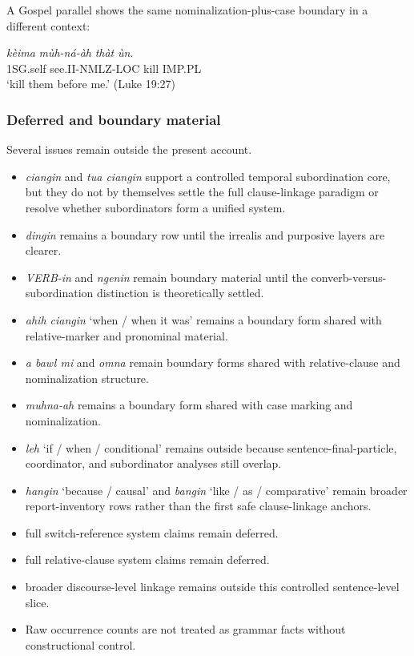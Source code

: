 \documentclass[
  11pt,
  a4paper,
]{article}
\providecommand{\tightlist}{%
  \setlength{\itemsep}{0pt}\setlength{\parskip}{0pt}}
\newcommand{\tdim}[1]{\textit{#1}}
\newcommand{\tdimword}[1]{\textit{#1}}
\renewcommand{\textsc}[1]{{\footnotesize\MakeUppercase{#1}}}
\newcommand{\glossquote}[1]{`#1'}
\begin{document}
A Gospel parallel shows the same nominalization-plus-case boundary in a
different context:

\begin{exe}
\ex \label{ex:clause-muhnaah-luke19p27}
\gll \tdimword{kèima} \tdimword{mùh-ná-àh} \tdimword{thàt} \tdimword{ùn.} \\
     \textsc{1sg}.self see.\textsc{ii}-\textsc{nmlz}-\textsc{loc} kill \textsc{imp}.\textsc{pl} \\
\glt \glossquote{kill them before me.} (Luke 19:27)
\end{exe}

\subsubsection{Deferred and boundary
material}\label{deferred-and-boundary-material-9}

Several issues remain outside the present account.

\begin{itemize}
\tightlist
\item
  \tdim{ciangin} and \tdim{tua ciangin} support a controlled temporal
  subordination core, but they do not by themselves settle the full
  clause-linkage paradigm or resolve whether subordinators form a
  unified system.
\item
  \tdim{dingin} remains a boundary row until the irrealis and purposive
  layers are clearer.
\item
  \tdim{VERB-in} and \tdim{ngenin} remain boundary material until the
  converb-versus-subordination distinction is theoretically settled.
\item
  \tdim{ahih ciangin} \glossquote{when / when it was} remains a boundary
  form shared with relative-marker and pronominal material.
\item
  \tdim{a bawl mi} and \tdim{omna} remain boundary forms shared with
  relative-clause and nominalization structure.
\item
  \tdim{muhna-ah} remains a boundary form shared with case marking and
  nominalization.
\item
  \tdim{leh} \glossquote{if / when / conditional} remains outside
  because sentence-final-particle, coordinator, and subordinator
  analyses still overlap.
\item
  \tdim{hangin} \glossquote{because / causal} and \tdim{bangin}
  \glossquote{like / as / comparative} remain broader report-inventory
  rows rather than the first safe clause-linkage anchors.
\item
  full switch-reference system claims remain deferred.
\item
  full relative-clause system claims remain deferred.
\item
  broader discourse-level linkage remains outside this controlled
  sentence-level slice.
\item
  Raw occurrence counts are not treated as grammar facts without
  constructional control.
\end{itemize}
\end{document}
